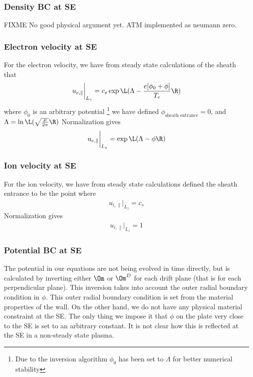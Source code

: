 \subsubsection{Density BC at SE}
%
%
%
FIXME
No good physical argument yet. ATM implemented as neumann zero.


\subsubsection{Electron velocity at SE}
%
For the electron velocity, we have from steady state calculations of the sheath
that
%
\begin{align*}
    u_{e,\|} \bigg|_{L_z} = c_s \exp\L(\Lambda - \frac{e[\phi_0 + \phi]}{T_e}\R)
\end{align*}
%
where $\phi_0$ is an arbitrary potential%
%
\footnote{Due to the inversion algorithm $\phi_0$ has been set to $\Lambda$ for
    better numerical stability}%
%
we have defined $\phi_{\text{sheath entrance}} = 0$, and
$\Lambda=\ln\L(\sqrt{\frac{\mu}{2\pi}}\R)$
%
Normalization gives
%
\begin{align*}
    u_{e,\|} \bigg|_{L_z} = \exp\L(\Lambda - \phi\R)
\end{align*}
%


\subsubsection{Ion velocity at SE}
For the ion velocity, we have from steady state calculations defined the sheath
entrance to be the point where
%
\begin{align*}
    u_{i,\|} \bigg|_{L_z} = c_s
\end{align*}
%
Normalization gives
%
\begin{align*}
    u_{i,\|} \bigg|_{L_z} = 1
\end{align*}
%

\subsubsection{Potential BC at SE}
%
The potential in our equations are not being evolved in time directly, but is
calculated by inverting either $\Om$ or $\Om^D$ for each drift plane (that is
for each perpendicular plane). This inversion takes into account the
outer radial boundary condition in $\phi$. This outer radial boundary condition
is set from the material properties of the wall. On the other hand, we do not
have any physical material constraint at the SE. The only thing we impose it
that $\phi$ on the plate very close to the SE is set to an arbitrary constant.
It is not clear how this is reflected at the SE in a non-steady state plasma.

